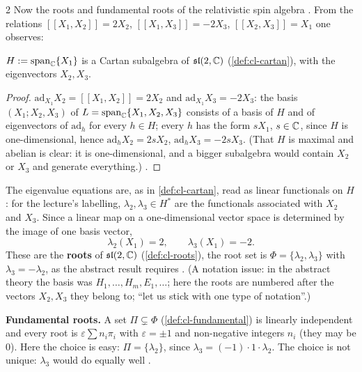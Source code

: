 \begin{paracol}{2}
Now the roots and fundamental roots of the relativistic spin algebra  . From the relations $[\![X_1,X_2]\!]=2X_2$, $[\![X_1,X_3]\!]=-2X_3$, $[\![X_2,X_3]\!]=X_1$ one observes:
\begin{proposition}\label{prop:sa-cartan}
$H:=\mathrm{span}_{\mathbb{C}}\{X_1\}$ is a Cartan subalgebra of $\mathfrak{sl}(2,\mathbb{C})$ (\cref{def:cl-cartan}), with the eigenvectors $X_2,X_3$.
\end{proposition}
\begin{proof}
$\mathrm{ad}_{X_1}X_2=[\![X_1,X_2]\!]=2X_2$ and $\mathrm{ad}_{X_1}X_3=-2X_3$: the basis $(X_1;X_2,X_3)$ of $L=\mathrm{span}_{\mathbb{C}}\{X_1,X_2,X_3\}$ consists of a basis of $H$ and of eigenvectors of $\mathrm{ad}_h$ for every $h\in H$; every $h$ has the form $sX_1$, $s\in\mathbb{C}$, since $H$ is one-dimensional, hence $\mathrm{ad}_hX_2=2sX_2$, $\mathrm{ad}_hX_3=-2sX_3$. (That $H$ is maximal and abelian is clear: it is one-dimensional, and a bigger subalgebra would contain $X_2$ or $X_3$ and generate everything.)       .
\end{proof}
The eigenvalue equations are, as in \cref{def:cl-cartan}, read as linear functionals on $H$: for the lecture's labelling, $\lambda_2,\lambda_3\in H^*$ are the functionals associated with $X_2$ and $X_3$. Since a linear map on a one-dimensional vector space is determined by the image of one basis vector,
\[
  \lambda_2(X_1)=2,\qquad\lambda_3(X_1)=-2 .
\]
These are the \textbf{roots} of $\mathfrak{sl}(2,\mathbb{C})$ (\cref{def:cl-roots}), the root set is $\Phi=\{\lambda_2,\lambda_3\}$ with $\lambda_3=-\lambda_2$, as the abstract result requires         . (A notation issue: in the abstract theory the basis was $H_1,\dots,H_m,E_1,\dots$; here the roots are numbered after the vectors $X_2,X_3$ they belong to; ``let us stick with one type of notation''.) 

\textbf{Fundamental roots.} A set $\Pi\subsetneq\Phi$ (\cref{def:cl-fundamental}) is linearly independent and every root is $\varepsilon\sum n_i\pi_i$ with $\varepsilon=\pm1$ and non-negative integers $n_i$ (they may be $0$). Here the choice is easy: $\Pi=\{\lambda_2\}$, since $\lambda_3=(-1)\cdot1\cdot\lambda_2$. The choice is not unique: $\lambda_3$ would do equally well        .


\end{paracol}
